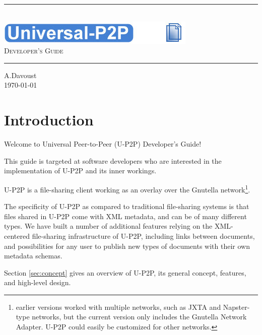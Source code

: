 \documentclass[titlepage]{article}%
\newcommand{\HRule}{\rule{\linewidth}{0.5mm}}
\begin{document}
\begin{titlepage}
 
\begin{center}
 
 
\HRule \\[3cm]

\includegraphics[scale=0.45]{diagrams/header_logo}\\[1.5cm]
 
\textsc{\LARGE Developer's Guide}\\[3cm]
 
\HRule 
 
\vfill
 
A.Davoust \\
\today
 
\end{center}
 
\end{titlepage}

\tableofcontents
\newpage

\section{Introduction}
Welcome to Universal Peer-to-Peer (U-P2P) Developer's Guide!

This guide is targeted at software developers who are interested in the implementation of U-P2P and its inner workings. 

U-P2P is a file-sharing client working as an overlay over the Gnutella network\footnote{earlier versions worked with multiple networks, such as JXTA and Napster-type networks, but the current version only includes the Gnutella Network Adapter. U-P2P could easily be customized for other networks.}.

The specificity of U-P2P as compared to traditional file-sharing systems is that files shared in U-P2P come with XML metadata, and can be of many different types. We have built a number of additional features relying on the XML-centered file-sharing infrastructure of U-P2P, including links between documents, and possibilities for any user to publish new types of documents with their own metadata schemas.

Section \ref{sec:concept} gives an overview of U-P2P, its general concept, features, and high-level design.
\end{document}
